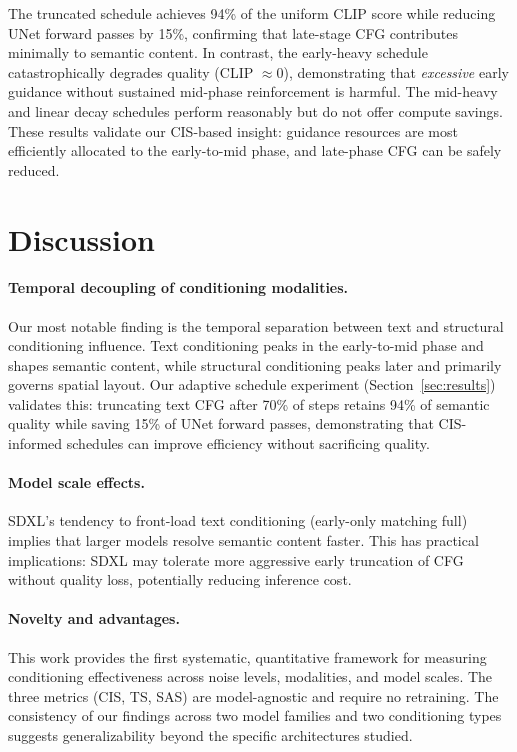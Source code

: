\documentclass{article}
\begin{document}
The truncated schedule achieves 94\% of the uniform CLIP score while reducing UNet forward passes by 15\%, confirming that late-stage CFG contributes minimally to semantic content. In contrast, the early-heavy schedule catastrophically degrades quality (CLIP $\approx 0$), demonstrating that \emph{excessive} early guidance without sustained mid-phase reinforcement is harmful. The mid-heavy and linear decay schedules perform reasonably but do not offer compute savings. These results validate our CIS-based insight: guidance resources are most efficiently allocated to the early-to-mid phase, and late-phase CFG can be safely reduced.

\section{Discussion}
\label{sec:discussion}

\paragraph{Temporal decoupling of conditioning modalities.}
Our most notable finding is the temporal separation between text and structural conditioning influence. Text conditioning peaks in the early-to-mid phase and shapes semantic content, while structural conditioning peaks later and primarily governs spatial layout. Our adaptive schedule experiment (Section~\ref{sec:results}) validates this: truncating text CFG after 70\% of steps retains 94\% of semantic quality while saving 15\% of UNet forward passes, demonstrating that CIS-informed schedules can improve efficiency without sacrificing quality.

\paragraph{Model scale effects.}
SDXL's tendency to front-load text conditioning (early-only matching full) implies that larger models resolve semantic content faster. This has practical implications: SDXL may tolerate more aggressive early truncation of CFG without quality loss, potentially reducing inference cost.

\paragraph{Novelty and advantages.}
This work provides the first systematic, quantitative framework for measuring conditioning effectiveness across noise levels, modalities, and model scales. The three metrics (CIS, TS, SAS) are model-agnostic and require no retraining. The consistency of our findings across two model families and two conditioning types suggests generalizability beyond the specific architectures studied.
\end{document}
